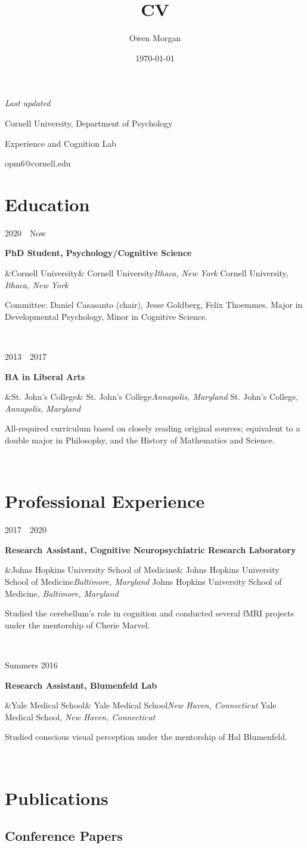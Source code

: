 \documentclass{article}
\author{Owen Morgan}
\title{CV}
\date{\today}
\makeatletter
\newcommand{\entry}[5]{

  \begin{minipage}[t]{.15\textwidth}
    \begin{flushright}
      \hfill {#1}
    \end{flushright}
  \end{minipage}
  \hfill\vline\hfill
  \begin{minipage}[t]{.80\textwidth}
    \textbf{#2}

    \ifx&#3&
      {#3}\textit{#4}
    \else
      {#3, }\textit{#4}

    \fi
    \footnotesize{#5}
  \end{minipage}\\\vspace{.25cm}
}
\newcommand{\cu}{Cornell University}
\newcommand{\sjc}{St. John's College}
\newcommand{\jhusom}{Johns Hopkins University School of Medicine}
\let\oldhref\href
\renewcommand{\href}[3][blue]{\oldhref{#2}{\color{#1}{#3}}}
\renewcommand{\maketitle}{
  \begin{minipage}[t]{.5\textwidth}
    \begin{flushleft}
      \textit{Last updated \thedate}
    \end{flushleft}
  \end{minipage}
  \begin{minipage}[t]{.5\textwidth}
    \begin{flushright}
      {\huge\bfseries
      \theauthor}

      \vspace{.25em}

      \cu, Department of Psychology

      Experience and Cognition Lab

      opm6@cornell.edu

      \href{https://opmorgan.com}{opmorgan.com}

    \end{flushright}
  \end{minipage}
}
\makeatother
\begin{document}
\maketitle

\section{Education}

\entry
{2020~\textendash~Now}
{PhD Student, Psychology/Cognitive Science}
{\cu}{Ithaca, New York}
{Committee: Daniel Casasanto (chair), Jesse Goldberg, Felix Thoemmes. Major in Developmental Psychology, Minor in Cognitive Science.}

\entry
{2013~\textendash~2017}
{BA in Liberal Arts}
{\sjc}{Annapolis, Maryland}
{All-required curriculum based on closely reading original sources; equivalent to a double major in Philosophy, and the History of Mathematics and Science.}

\section{Professional Experience}

\entry
{2017~\textendash~2020}
{Research Assistant, Cognitive Neuropsychiatric Research Laboratory}
{\jhusom}{Baltimore, Maryland}
{Studied the cerebellum’s role in cognition and conducted several fMRI projects under the mentorship of Cherie Marvel.}

\entry
{Summers 2016 }
{Research Assistant, Blumenfeld Lab}
{Yale Medical School}{New Haven, Connecticut}
{Studied conscious visual perception under the mentorship of Hal Blumenfeld.}

\section{Publications}



\subsection{Conference Papers}
\nocite{*}
\printbibliography[heading=none]
\end{document}
